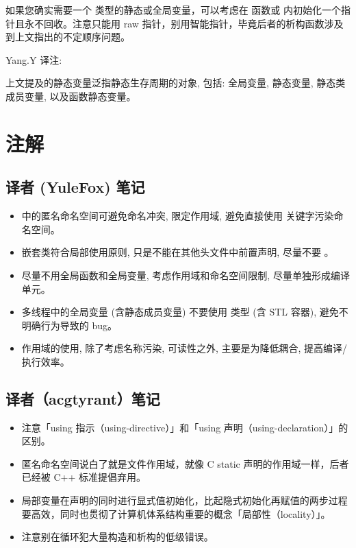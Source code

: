 如果您确实需要一个  类型的静态或全局变量，可以考虑在  函数或 
内初始化一个指针且永不回收。注意只能用 raw 指针，别用智能指针，毕竟后者的析构函数涉及到上文指出的不定顺序问题。

\begin{DNote}
  Yang.Y 译注:

  上文提及的静态变量泛指静态生存周期的对象, 包括: 全局变量, 静态变量, 静态类成员变量, 以及函数静态变量。
\end{DNote}

\section{注解}

\subsection{ 译者 (YuleFox) 笔记}

\begin{itemize}
  \item {} 中的匿名命名空间可避免命名冲突, 限定作用域, 避免直接使用  关键字污染命名空间。
  \item 嵌套类符合局部使用原则, 只是不能在其他头文件中前置声明, 尽量不要 。
  \item 尽量不用全局函数和全局变量, 考虑作用域和命名空间限制, 尽量单独形成编译单元。
  \item 多线程中的全局变量 (含静态成员变量) 不要使用  类型 (含 STL 容器), 避免不明确行为导致的 bug。
  \item 作用域的使用, 除了考虑名称污染, 可读性之外, 主要是为降低耦合, 提高编译/执行效率。
\end{itemize}


\subsection{  译者（acgtyrant）笔记 }

\begin{itemize}
  \item 注意「using 指示（using-directive）」和「using 声明（using-declaration）」的区别。
  \item 匿名命名空间说白了就是文件作用域，就像 C static 声明的作用域一样，后者已经被 C++ 标准提倡弃用。
  \item 局部变量在声明的同时进行显式值初始化，比起隐式初始化再赋值的两步过程要高效，同时也贯彻了计算机体系结构重要的概念「局部性（locality）」。
  \item 注意别在循环犯大量构造和析构的低级错误。
\end{itemize}